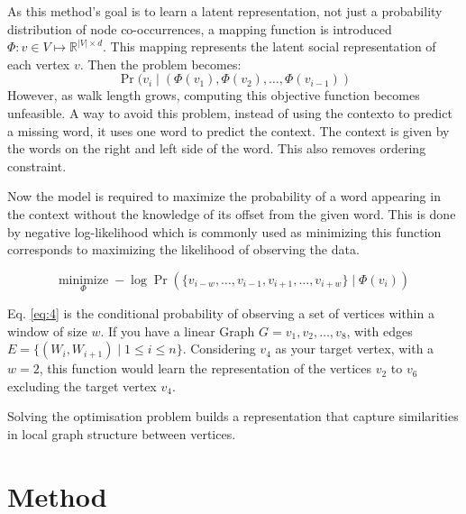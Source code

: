 \documentclass{article}
\begin{document}
As this method's goal is to learn a latent representation, not just a
probability distribution of node co-occurrences, a mapping function is
introduced $\Phi: v \in V \mapsto \mathbb{R}^{\vert V \vert \times d} $.
This mapping represents the latent social representation of each vertex $v$.
Then the problem becomes:
\begin{equation}
  \Pr(v_i \mid (\Phi(v_1), \Phi(v_2), \ldots, \Phi(v_{i-1}))
  \label{eq:3}
\end{equation}
However, as walk length grows, computing this objective function becomes
unfeasible. A way to avoid this problem, instead of using the contexto to
predict a missing word, it uses one word to predict the context. The context is
given by the words on the right and left side of the word. This also removes
ordering constraint. 

Now the model is required to maximize the probability of a word appearing in
the context without the knowledge of its offset from the given word. This is
done by negative log-likelihood which is commonly used as minimizing this
function corresponds to maximizing the likelihood of observing the data.

\begin{equation}
  \underset{\Phi}{\text{minimize}} \; -\log \Pr\left( \{v_{i-w}, \ldots,
  v_{i-1}, v_{i+1}, \ldots, v_{i+w}\} \mid \Phi(v_i) \right)
  \label{eq:4}
\end{equation}

Eq. \ref{eq:4} is the conditional probability of observing a set of vertices
within a window of size $w$. If you have a linear Graph $G = v_1, v_2, \ldots, v_8$,
with edges $E = \{ (W_i, W_{i+1}) \mid 1 \leq i \leq n \}$. 
Considering $v_4$ as your target vertex, with a $w = 2$, this function would
learn the representation of the vertices $v_2$ to $v_6$ excluding the target
vertex $v_4$.

Solving the optimisation problem builds a representation that capture similarities
in local graph structure between vertices. 

\section{Method}
\end{document}
